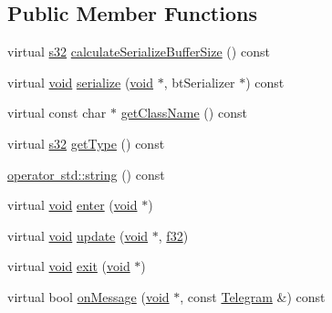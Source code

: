 \subsection*{Public Member Functions}
\begin{DoxyCompactItemize}
\item 
virtual \mbox{\hyperlink{_util_8h_aa62c75d314a0d1f37f79c4b73b2292e2}{s32}} \mbox{\hyperlink{classnjli_1_1_world_state_a0f6f93f94e50e06abc16b65c5e92ecef}{calculate\+Serialize\+Buffer\+Size}} () const
\item 
virtual \mbox{\hyperlink{_thread_8h_af1e856da2e658414cb2456cb6f7ebc66}{void}} \mbox{\hyperlink{classnjli_1_1_world_state_ae671bdd4b655e47482bc5d418e51b097}{serialize}} (\mbox{\hyperlink{_thread_8h_af1e856da2e658414cb2456cb6f7ebc66}{void}} $\ast$, bt\+Serializer $\ast$) const
\item 
virtual const char $\ast$ \mbox{\hyperlink{classnjli_1_1_world_state_af6ff6a2f1813d2727014c3632be42add}{get\+Class\+Name}} () const
\item 
virtual \mbox{\hyperlink{_util_8h_aa62c75d314a0d1f37f79c4b73b2292e2}{s32}} \mbox{\hyperlink{classnjli_1_1_world_state_a4253a21b944bca8de133d3a4cad0112e}{get\+Type}} () const
\item 
\mbox{\hyperlink{classnjli_1_1_world_state_ab33fef32f2cdf0e1a99bc94939f17e03}{operator std\+::string}} () const
\item 
virtual \mbox{\hyperlink{_thread_8h_af1e856da2e658414cb2456cb6f7ebc66}{void}} \mbox{\hyperlink{classnjli_1_1_world_state_ad126287c45283df721b113c6a08a00f9}{enter}} (\mbox{\hyperlink{_thread_8h_af1e856da2e658414cb2456cb6f7ebc66}{void}} $\ast$)
\item 
virtual \mbox{\hyperlink{_thread_8h_af1e856da2e658414cb2456cb6f7ebc66}{void}} \mbox{\hyperlink{classnjli_1_1_world_state_a7390c8af937d9be5f95e33e300321171}{update}} (\mbox{\hyperlink{_thread_8h_af1e856da2e658414cb2456cb6f7ebc66}{void}} $\ast$, \mbox{\hyperlink{_util_8h_a5f6906312a689f27d70e9d086649d3fd}{f32}})
\item 
virtual \mbox{\hyperlink{_thread_8h_af1e856da2e658414cb2456cb6f7ebc66}{void}} \mbox{\hyperlink{classnjli_1_1_world_state_a567bac6ea9dc0445e0cb7a14a8a2e271}{exit}} (\mbox{\hyperlink{_thread_8h_af1e856da2e658414cb2456cb6f7ebc66}{void}} $\ast$)
\item 
virtual bool \mbox{\hyperlink{classnjli_1_1_world_state_a945df2e0dac944feb4023987b9bbe874}{on\+Message}} (\mbox{\hyperlink{_thread_8h_af1e856da2e658414cb2456cb6f7ebc66}{void}} $\ast$, const \mbox{\hyperlink{classnjli_1_1_telegram}{Telegram}} \&) const

\end{DoxyCompactItemize}
